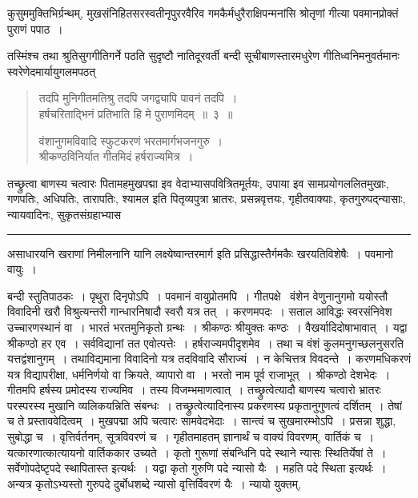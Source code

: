 \documentclass[11pt, openany]{book}
\begin{document}
\newpage

\noindent
कुसुममुक्तिभिर्ग्रन्थम्, मुखसंनिहितसरस्वतीनृपुररवैरिव गमकैर्मधुरैराक्षिपन्मनांसि श्रोतृणां गीत्या पवमानप्रोक्तं पुराणं पपाठ~।

तस्मिंश्च तथा श्रुतिसुगगीतिगर्ने पठति सुदृष्टौ नातिदूरवर्ती बन्दी सूचीबाणस्तारमधुरेण गीतिध्वनिमनुवर्तमानः स्वरेणेदमार्यायुगलमपठत् \textendash\ 

\vspace{-5mm}
\begin{quote}
{\ha तदपि मुनिगीतमतिश्रु तदपि जगद्व्यापि पावनं तदपि~।\\
हर्षचरिताद्भिनं प्रतिभाति हि मे पुराणमिदम्~॥~३~॥

वंशानुगमविवादि स्फुटकरणं भरतमार्गभजनगुरु~।\\
श्रीकण्ठविनिर्यात गीतमिदं हर्षराज्यमित्र~।}
\end{quote}

\vspace{-5mm}
तच्छ्रुत्वा बाणस्य चत्वारः पितामहमुखपद्मा इव वेदाभ्यासपवित्रितमूर्तयः, उपाया इव सामप्रयोगललितमुखाः, गणपतिः, अधिपतिः, तारापतिः, श्यामल इति पितृव्यपुत्रा भ्रातरः, प्रसन्नवृत्तयः, गृहीतवाक्याः, कृतगुरुपद्न्यासाः, न्यायवादिनः, सुकृतसंग्रहाभ्यास\textendash

\vspace{2mm}
\hrule

\noindent
{\s असाधारयनि खराणां निमीलनानि यानि लक्ष्येष्वान्तरमार्ग इति प्रसिद्धास्तैर्गमकैः खरयतिविशेषैः~। पवमानो वायुः~।

बन्दी स्तुतिपाठकः~। पृथुरा दिनृपोऽपि~। पवमानं वायुप्रोतमपि~। गीतपक्षे \textendash\ वंशेन वेणुनानुगमो ययोस्तौ विवादिनी खरौ विश्रुत्यन्तरी गान्धारनिषादौ स्वरौ यत्र तत्~। करणमपदः~। सताल आविद्धः स्वरसंनिवेश उच्चारणस्थानं वा~। भारतं भरतमुनिकृतो ग्रन्थः~। श्रीकण्ठः श्रीयुक्तः कण्ठः~। वैखर्यादिदोषाभावात्~। यद्वा श्रीकण्ठो हर एव~। सर्वविद्यानां तत एवोत्पत्तेः~। हर्षराज्यमपीदृशमेव~। तथा च वंशं कुलमनुगच्छलनुसरति यत्तद्वंशानुगम्~। तथाविद्यमाना विवादिनो यत्र तदविवादि सौराज्यं~। न केचित्तत्र विवदन्ते~। करणमधिकरणं यत्र विद्यापरीक्षा, धर्मनिर्णयो वा क्रियते, व्यापारो वा~। भरतो नाम पूर्व राजाभूत्~। श्रीकण्ठो देशभेदः~। गीतमपि हर्षस्य प्रमोदस्य राज्यमिव~। तस्य विजम्भमाणत्वात्~। तच्छ्रुत्वेत्यादौ बाणस्य चत्वारो भ्रातरः परस्परस्य मुखानि व्यलिकयन्निति संबन्धः~। तच्छ्रुत्वेत्यादिनास्य प्रकरणस्य प्रकृतानुगुणत्वं दर्शितम्~। तेषां च ते प्रस्ताववेदित्वम्~। मुखपद्मा अपि चत्वारः सामवेदभेदाः~। सान्त्वं च सुखमारम्भोऽपि~। प्रसन्ना शुद्धा, सुबोद्धा च~। वृत्तिर्वर्तनम्, सूत्रविवरणं च~। गृहीतमाहतम् ज्ञानार्थं च वाक्यं विवरणम्, वार्तिकं च~। यत्कारणात्कात्यायनो वार्तिककार उच्यते~। कृतो गुरूणां संबन्धिनि पदे स्थाने न्यासः स्थितिर्येषां ते~। सर्वेणोपदेष्टृपदे स्थापितास्त इत्यर्थः~। यद्वा कृतो गुरुणि पदे न्यासो यैः~। महति पदे स्थिता इत्यर्थः~। अन्यत्र कृतोऽभ्यस्तो गुरुपदे दुर्बोधशब्दे न्यासो वृत्तिर्विवरणं यैः~। न्यायो युक्तम्,}
\end{document}
